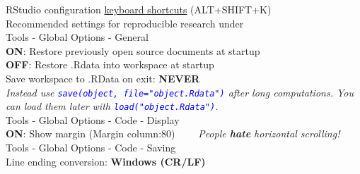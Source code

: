 \documentclass[xcolor=table,       handout,    xcolor=dvipsnames]{beamer}\usepackage[]{graphicx}\usepackage[]{color}
\newcommand{\rcode}[1]{\texttt{\textcolor{Blue}{#1}}} %
\begin{document}

\begin{frame}{RStudio configuration}
\href{https://support.rstudio.com/hc/en-us/articles/200711853-Keyboard-Shortcuts}{keyboard shortcuts} (ALT+SHIFT+K)\\[1em]
\pause
Recommended settings for reproducible research under\\
\alert{Tools - Global Options - General}\\
\textbf{ON}: Restore previously open source documents at startup\\
\textbf{OFF}: Restore .Rdata into workspace at startup\\
Save workspace to .RData on exit: \textbf{NEVER}\\[0.5em]
\pause
\textit{Instead use \rcode{save(object, file="object.Rdata")} after long computations.
You can load them later with \rcode{load("object.Rdata")}.}\\[1em]
\pause
\alert{Tools - Global Options - Code - Display}\\
\textbf{ON}: Show margin (Margin column:80) ~~~~\textit{People \textbf{hate} horizontal scrolling!}\\[0.5em]
\alert{Tools - Global Options - Code - Saving}\\
Line ending conversion: \textbf{Windows (CR/LF)}
\end{frame}

\end{document}
